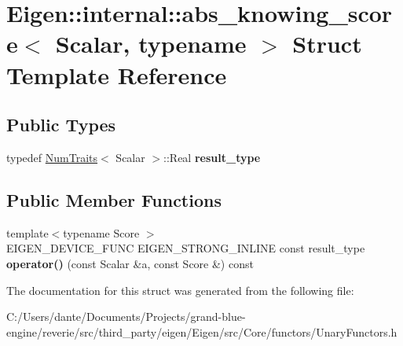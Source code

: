 \hypertarget{struct_eigen_1_1internal_1_1abs__knowing__score}{}\section{Eigen\+::internal\+::abs\+\_\+knowing\+\_\+score$<$ Scalar, typename $>$ Struct Template Reference}
\label{struct_eigen_1_1internal_1_1abs__knowing__score}
\subsection*{Public Types}
\begin{DoxyCompactItemize}
\item 
\mbox{\label{struct_eigen_1_1internal_1_1abs__knowing__score_a5e8bf72072f7610591df4e9b6eaf25a5}} 
typedef \mbox{\hyperlink{struct_eigen_1_1_num_traits}{Num\+Traits}}$<$ Scalar $>$\+::Real {\bfseries result\+\_\+type}
\end{DoxyCompactItemize}
\subsection*{Public Member Functions}
\begin{DoxyCompactItemize}
\item 
\mbox{\label{struct_eigen_1_1internal_1_1abs__knowing__score_ae43aa25e52af13ab934224535a1606e2}} 
{\footnotesize template$<$typename Score $>$ }\\E\+I\+G\+E\+N\+\_\+\+D\+E\+V\+I\+C\+E\+\_\+\+F\+U\+NC E\+I\+G\+E\+N\+\_\+\+S\+T\+R\+O\+N\+G\+\_\+\+I\+N\+L\+I\+NE const result\+\_\+type {\bfseries operator()} (const Scalar \&a, const Score \&) const
\end{DoxyCompactItemize}


The documentation for this struct was generated from the following file\+:\begin{DoxyCompactItemize}
\item 
C\+:/\+Users/dante/\+Documents/\+Projects/grand-\/blue-\/engine/reverie/src/third\+\_\+party/eigen/\+Eigen/src/\+Core/functors/Unary\+Functors.\+h\end{DoxyCompactItemize}
